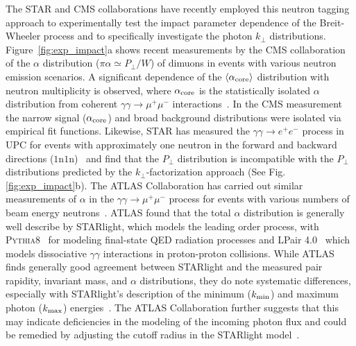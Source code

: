 \documentclass[12pt,epjc3]{svjour3}\sloppy
\begin{document}
The STAR and CMS collaborations have recently employed this neutron tagging approach to experimentally test the impact parameter dependence of the Breit-Wheeler process and to specifically investigate the photon $k_\perp$ distributions.
Figure~\ref{fig:exp_impact}a shows recent measurements by the CMS collaboration of the $\alpha$ distribution ($\pi\alpha \simeq P_\perp / W$) of dimuons in events with various neutron emission scenarios.
A significant dependence of the $\langle\alpha_{\rm core}\rangle$ distribution with neutron multiplicity is observed, where $\alpha_{\rm core}$ is the statistically isolated $\alpha$ distribution from coherent $\gamma\gamma \rightarrow \mu^+\mu^-$ interactions~\cite{cmscollaborationObservationForwardNeutron2020a}. 
In the CMS measurement the narrow signal ($\alpha_{\rm core}$) and broad background distributions were isolated via empirical fit functions. Likewise, STAR has measured the $\gamma\gamma \rightarrow e^+e^-$ process in UPC for events with approximately one neutron in the forward and backward directions ($1$n$1$n)~\cite{starcollaborationMeasurementMomentumAngular2021} and find that the $P_\perp$ distribution is incompatible with the $P_\perp$ distributions predicted by the $k_\perp$-factorization approach (See Fig.\ref{fig:exp_impact}b).
The ATLAS Collaboration has carried out similar measurements of $\alpha$ in the $\gamma\gamma \rightarrow \mu^+\mu^-$ process for events with various numbers of beam energy neutrons~\cite{atlascollaborationExclusiveDimuonProduction2020}. ATLAS found that the total $\alpha$ distribution is generally well describe by STARlight, which models the leading order process, with P\textsc{ythia}8~\cite{sjostrandIntroductionPYTHIA2015} for modeling final-state QED radiation processes and LPair 4.0~\cite{vermaserenTwophotonProcessesVery1983} which models dissociative $\gamma\gamma$ interactions in proton-proton collisions. While ATLAS finds generally good agreement between STARlight and the measured pair rapidity, invariant mass, and $\alpha$ distributions, they do note systematic differences, especially with STARlight's description of the minimum ($k_{\rm min}$) and maximum photon ($k_{\rm max}$) energies~\cite{atlascollaborationExclusiveDimuonProduction2020}. The ATLAS Collaboration further suggests that this may indicate deficiencies in the modeling of the incoming photon flux and could be remedied by adjusting the cutoff radius in the STARlight model~\cite{atlascollaborationExclusiveDimuonProduction2020}.        
\end{document}
